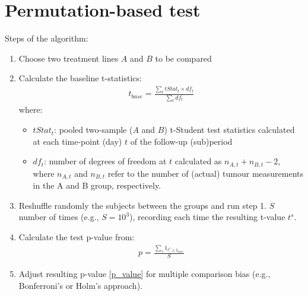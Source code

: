 \section{Permutation-based test}
\label{Appendix_Permutation_test}
Steps of the algorithm:
\begin{enumerate}
	\item Choose two treatment lines $A$ and $B$ to be compared
	\item Calculate the baseline t-statistics:
	      \begin{align}
	      	t_{base} = \frac{\sum_{t}tStat_{t}\times df_{t}}{\sum_{t}df_{t}}
	      	\label{baseline_t}
	      \end{align}
	      where:
	      \begin{itemize}
	      	\item $tStat_{t}$: pooled two-sample ($A$ and $B$) t-Student test statistics calculated at each time-point (day) $t$ of the follow-up (sub)period
	      	\item $df_{t}$: number of degrees of freedom at $t$ calculated as $n_{A,t} + n_{B,t} - 2$, where $n_{A,t}$ and $n_{B,t}$ refer to the number of (actual) tumour measurements in the A and B group, respectively.
	      \end{itemize}
	\item Reshuffle randomly the subjects between the groups and run step 1.
	      $S$ number of times (e.g., $S=10^{3}$), recording each time the resulting t-value $t^{s}$.
	\item Calculate the test p-value from:
	      \begin{align}
	      	p=\frac{\sum_{s}1_{t^{s}\geq t_{base}}}{S}
	      	\label{p_value}
	      \end{align}
	\item Adjust resulting p-value \cref{p_value} for multiple comparison bias (e.g., Bonferroni's or Holm's approach).
\end{enumerate}
